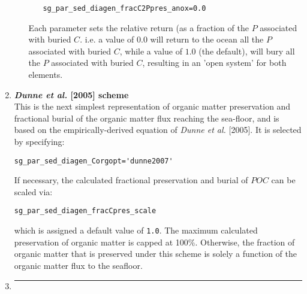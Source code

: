 \begin{enumerate}
\begin{enumerate}
\begin{itemize}[noitemsep]
\begin{verbatim}
sg_par_sed_diagen_fracC2Ppres_anox=0.0
\end{verbatim}\normalsize\vspace{-0mm}
\end{itemize}
\vspace{1mm}
Each parameter sets the relative return (as a fraction of the \(P\) associated with buried \(C\). i.e. a value of \(0.0\) will return to the ocean all the \(P\) associated with buried \(C\), while a value of \(1.0\) (the default), will bury all the \(P\) associated with buried \(C\), resulting in an 'open system' for both elements.
\end{enumerate}

\newpage
%
\vspace{1mm}
\item \textbf{\textit{Dunne et al.} [2005] scheme}
\vspace{1mm}
\\This is the next simplest representation of organic matter preservation  and fractional burial of the organic matter flux reaching the sea-floor, and is based on the empirically-derived equation of \textit{Dunne et al.} [2005]. It is selected by specifying:
\vspace{-1mm}\small\begin{verbatim}
sg_par_sed_diagen_Corgopt='dunne2007'
\end{verbatim}\normalsize\vspace{-1mm}

If necessary, the calculated fractional preservation and burial of \(POC\)  can be scaled via:
\vspace{-1mm}\small\begin{verbatim}
sg_par_sed_diagen_fracCpres_scale
\end{verbatim}\normalsize\vspace{-1mm}
which is assigned a default value of \texttt{1.0}. The maximum calculated preservation of organic matter is capped at 100\%. Otherwise, the fraction of organic matter that is preserved under this scheme is solely a function of the organic matter flux to the seafloor.  

\item []\noindent\rule{4cm}{0.5pt}
\vspace{1mm}


\end{enumerate}
